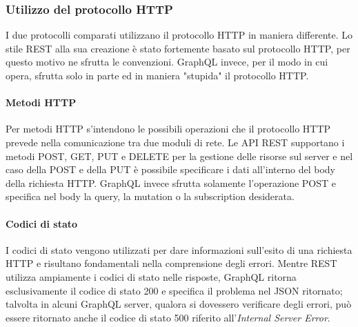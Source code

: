 \subsubsection{Utilizzo del protocollo HTTP}
I due protocolli comparati utilizzano il protocollo HTTP in maniera differente. Lo stile REST alla sua creazione è stato fortemente basato sul protocollo HTTP, per questo motivo ne sfrutta le convenzioni. GraphQL invece, per il modo in cui opera, sfrutta solo in parte ed in maniera "stupida" il protocollo HTTP.
\paragraph{Metodi HTTP}
Per metodi HTTP s'intendono le possibili operazioni che il protocollo HTTP prevede nella comunicazione tra due moduli di rete. Le API REST supportano i metodi POST, GET, PUT e DELETE per la gestione delle risorse sul server e nel caso della POST e della PUT è possibile specificare i dati all'interno del body della richiesta HTTP. GraphQL invece sfrutta solamente l'operazione POST e specifica nel body la query, la mutation o la subscription desiderata.
\paragraph{Codici di stato}
I codici di stato vengono utilizzati per dare informazioni sull'esito di una richiesta HTTP e risultano fondamentali nella comprensione degli errori. Mentre REST utilizza ampiamente i codici di stato nelle risposte, GraphQL ritorna esclusivamente il codice di stato 200 e specifica il problema nel JSON ritornato; talvolta in alcuni GraphQL server, qualora si dovessero verificare degli errori, può essere ritornato anche il codice di stato 500 riferito all'\textit{Internal Server Error}.
